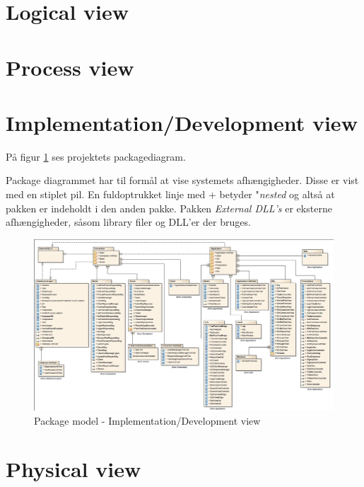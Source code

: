\section{Logical view}


\section{Process view}

\section{Implementation/Development view}

På figur \ref{fig:packageDiagram} ses projektets packagediagram.

Package diagrammet har til formål at vise systemets afhængigheder. Disse er vist med en stiplet pil. En fuldoptrukket linje med + betyder "\textit{nested} og altså at pakken er indeholdt i den anden pakke. Pakken \textit{External DLL's} er eksterne afhængigheder, såsom library filer og DLL'er der bruges.

\begin{landscape}
	\begin{figure}[H]
		\centering
		\includegraphics[width=\linewidth]{figs/arkitektur/packageDiagram.PNG}
		\caption{Package model - Implementation/Development view}
		\label{fig:packageDiagram}
	\end{figure}
\end{landscape}

\section{Physical view}
 
